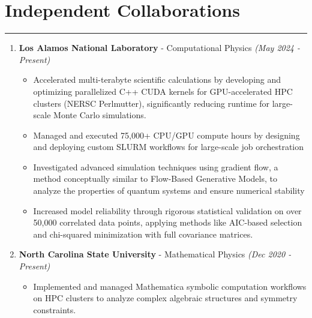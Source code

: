 \documentclass[11pt]{article}
\begin{document}
\section*{Independent Collaborations}
\hrule
\vspace{-0.3em}
\begin{enumerate}
    \item \textbf{Los Alamos National Laboratory} - Computational Physics \hfill \textit{(May 2024 - Present)}
\vspace{-0.5em}
\begin{itemize}
    \item Accelerated multi-terabyte scientific calculations by developing and optimizing parallelized C++ CUDA kernels for GPU-accelerated HPC clusters (NERSC Perlmutter), significantly reducing runtime for large-scale Monte Carlo simulations.
    \vspace{-0.5em}
    \item Managed and executed 75,000+ CPU/GPU compute hours by designing and deploying custom SLURM workflows for large-scale job orchestration
    \vspace{-0.5em}
    \item Investigated advanced simulation techniques using gradient flow, a method conceptually similar to Flow-Based Generative Models, to analyze the properties of quantum systems and ensure numerical stability
    \vspace{-0.9em}
    \item Increased model reliability through rigorous statistical validation on over 50,000 correlated data points, applying methods like AIC-based selection and chi-squared minimization with full covariance matrices.
\end{itemize}

    \item  \textbf{North Carolina State University} - Mathematical Physics  \hfill \textit{(Dec 2020 - Present)}
\vspace{-0.5em}
\begin{itemize}
    \item Implemented and managed Mathematica symbolic computation workflows on HPC clusters to analyze complex algebraic structures and symmetry constraints.
\end{itemize}

\end{enumerate}

\vspace{0.5em}
\end{document}
